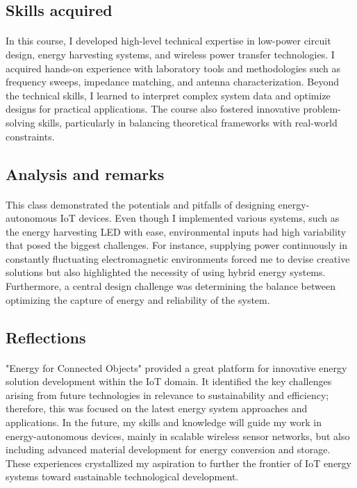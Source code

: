 \subsection{Skills acquired}
\paragraph{}In this course, I developed high-level technical expertise in low-power circuit design, energy harvesting systems, and wireless power transfer technologies. I acquired hands-on experience with laboratory tools and methodologies such as frequency sweeps, impedance matching, and antenna characterization. Beyond the technical skills, I learned to interpret complex system data and optimize designs for practical applications. The course also fostered innovative problem-solving skills, particularly in balancing theoretical frameworks with real-world constraints.

\subsection{Analysis and remarks}
\paragraph{}This class demonstrated the potentials and pitfalls of designing energy-autonomous IoT devices. Even though I implemented various systems, such as the energy harvesting LED with ease, environmental inputs had high variability that posed the biggest challenges. For instance, supplying power continuously in constantly fluctuating electromagnetic environments forced me to devise creative solutions but also highlighted the necessity of using hybrid energy systems. Furthermore, a central design challenge was determining the balance between optimizing the capture of energy and reliability of the system.

\subsection{Reflections}
\paragraph{}"Energy for Connected Objects" provided a great platform for innovative energy solution development within the IoT domain. It identified the key challenges arising from future technologies in relevance to sustainability and efficiency; therefore, this was focused on the latest energy system approaches and applications. In the future, my skills and knowledge will guide my work in energy-autonomous devices, mainly in scalable wireless sensor networks, but also including advanced material development for energy conversion and storage. These experiences crystallized my aspiration to further the frontier of IoT energy systems toward sustainable technological development.